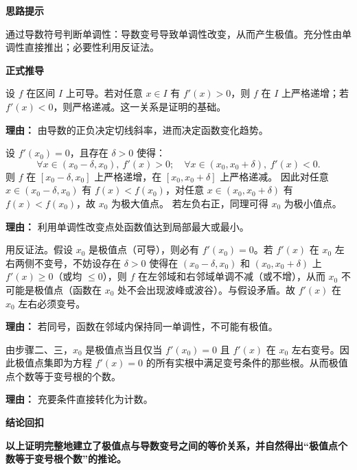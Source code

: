 \begin{proofbox}
	\textbf{\textcolor{CProof}{思路提示}}

	通过导数符号判断单调性：导数变号导致单调性改变，从而产生极值。充分性由单调性直接推出；必要性利用反证法。

	\medskip
	\textbf{\textcolor{CProof}{正式推导}}
	\begin{description}[style=nextline, leftmargin=2.8em, labelsep=0.5em, itemsep=0.55em]
		\item[\textbf{步骤一（导数与单调性）：}] 设 $f$ 在区间 $I$ 上可导。若对任意 $x\in I$ 有 $f'(x)>0$，则 $f$ 在 $I$ 上严格递增；若 $f'(x)<0$，则严格递减。这一关系是证明的基础。
			\par\textbf{理由：} 由导数的正负决定切线斜率，进而决定函数变化趋势。

		\item[\textbf{步骤二（变号判极值）：}] 设 $f'(x_0)=0$，且存在 $\delta>0$ 使得：
			\[
				\forall x\in (x_0-\delta,x_0),\ f'(x)>0;\quad
				\forall x\in (x_0,x_0+\delta),\ f'(x)<0.
			\]
			则 $f$ 在 $[x_0-\delta,x_0]$ 上严格递增，在 $[x_0,x_0+\delta]$ 上严格递减。
			因此对任意 $x\in (x_0-\delta,x_0)$ 有 $f(x)<f(x_0)$，对任意 $x\in (x_0,x_0+\delta)$ 有 $f(x)<f(x_0)$，故 $x_0$ 为极大值点。
			若左负右正，同理可得 $x_0$ 为极小值点。
			\par\textbf{理由：} 利用单调性改变点处函数值达到局部最大或最小。

		\item[\textbf{步骤三（反证证变号）：}] 用反证法。假设 $x_0$ 是极值点（可导），则必有 $f'(x_0)=0$。若 $f'(x)$ 在 $x_0$ 左右两侧不变号，不妨设存在 $\delta>0$ 使得在 $(x_0-\delta,x_0)$ 和 $(x_0,x_0+\delta)$ 上 $f'(x)\ge 0$（或均 $\le 0$），则 $f$ 在左邻域和右邻域单调不减（或不增），从而 $x_0$ 不可能是极值点（函数在 $x_0$ 处不会出现波峰或波谷）。与假设矛盾。故 $f'(x)$ 在 $x_0$ 左右必须变号。
			\par\textbf{理由：} 若同号，函数在邻域内保持同一单调性，不可能有极值。

		\item[\textbf{步骤四（计数结论）：}] 由步骤二、三，$x_0$ 是极值点当且仅当 $f'(x_0)=0$ 且 $f'(x)$ 在 $x_0$ 左右变号。因此极值点集即为方程 $f'(x)=0$ 的所有实根中满足变号条件的那些根。从而极值点个数等于变号根的个数。
			\par\textbf{理由：} 充要条件直接转化为计数。
	\end{description}

	\medskip
	\textbf{\textcolor{CProof}{结论回扣}}

	\textbf{以上证明完整地建立了极值点与导数变号之间的等价关系，并自然得出“极值点个数等于变号根个数”的推论。}
\end{proofbox}
